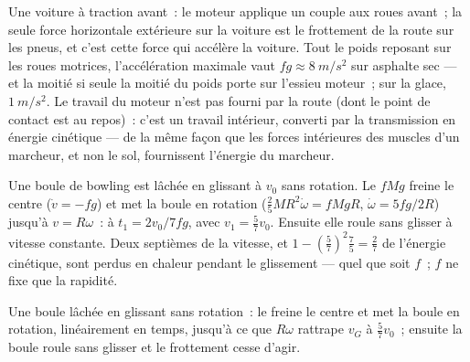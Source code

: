 \begin{example}\label{ex:b2:rigid-body-mechanics:car}
Une voiture à traction avant~: le moteur applique un couple aux roues
avant~; la seule force horizontale extérieure sur la voiture est le frottement
de la route sur les pneus, et c'est cette force qui accélère la
voiture. Tout le poids reposant sur les roues motrices, l'accélération maximale
vaut $fg \approx \qty{8}{m/s^2}$ sur asphalte sec --- et la moitié si seule
la moitié du poids porte sur l'essieu moteur~; sur la glace, $\qty{1}{m/s^2}$. Le
travail du moteur n'est pas fourni par la route (dont le point de contact est au repos)~:
c'est un travail intérieur, converti par la transmission en énergie cinétique
--- de la même façon que les forces intérieures des muscles d'un marcheur, et non le
sol, fournissent l'énergie du marcheur.
\end{example}

\begin{example}\label{ex:b2:rigid-body-mechanics:bowling}
Une boule de bowling est lâchée en glissant à $v_0$ sans rotation. Le  $fMg$ freine le centre ($\dot v = -fg$) et met la boule en rotation
($\tfrac25MR^2\dot\omega = fMgR$, $\dot\omega = 5fg/2R$) jusqu'à $v = R\omega$~:
à $t_1 = 2v_0/7fg$, avec $v_1 = \tfrac57v_0$. Ensuite elle roule
sans glisser à vitesse constante. Deux septièmes de la vitesse, et
$1 - (\tfrac57)^2\tfrac75 = \tfrac27$ de l'énergie cinétique, sont perdus en chaleur
pendant le glissement --- quel que soit $f$~; $f$ ne fixe que la rapidité.
\end{example}

\begin{omfigure}

{\small Une boule lâchée en glissant sans rotation~: le  freine
le centre et met la boule en rotation, linéairement en temps, jusqu'à ce que $R\omega$
rattrape $v_G$ à $\tfrac57v_0$~; ensuite la boule roule sans
glisser et le frottement cesse d'agir.}
\end{omfigure}

